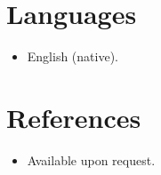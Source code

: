 \documentclass[11pt,a4paper,sans]{moderncv}
\begin{document}
\section{Languages}
\vspace{1pt}
\begin{itemize}
\item English (native).
\end{itemize}


\section{References}
\vspace{1pt}
\begin{itemize}
\item{Available upon request.}
\end{itemize}
\end{document}
